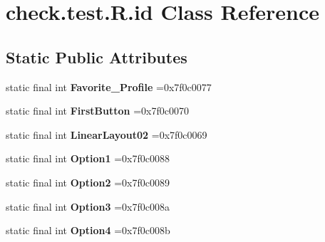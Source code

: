\hypertarget{classcheck_1_1test_1_1_r_1_1id}{}\section{check.\+test.\+R.\+id Class Reference}
\label{classcheck_1_1test_1_1_r_1_1id}
\subsection*{Static Public Attributes}
\begin{DoxyCompactItemize}
\item 
\hypertarget{classcheck_1_1test_1_1_r_1_1id_aa03ba75a03af6646416b8268bc50b51c}{}static final int {\bfseries Favorite\+\_\+\+Profile} =0x7f0c0077\label{classcheck_1_1test_1_1_r_1_1id_aa03ba75a03af6646416b8268bc50b51c}

\item 
\hypertarget{classcheck_1_1test_1_1_r_1_1id_a57a9e2e33ea1698752311ee2f1ab0b5f}{}static final int {\bfseries First\+Button} =0x7f0c0070\label{classcheck_1_1test_1_1_r_1_1id_a57a9e2e33ea1698752311ee2f1ab0b5f}

\item 
\hypertarget{classcheck_1_1test_1_1_r_1_1id_ac553af6d07f7501694b1685a3bbf904b}{}static final int {\bfseries Linear\+Layout02} =0x7f0c0069\label{classcheck_1_1test_1_1_r_1_1id_ac553af6d07f7501694b1685a3bbf904b}

\item 
\hypertarget{classcheck_1_1test_1_1_r_1_1id_a6513a6dad138e2680bfab91c487afb6a}{}static final int {\bfseries Option1} =0x7f0c0088\label{classcheck_1_1test_1_1_r_1_1id_a6513a6dad138e2680bfab91c487afb6a}

\item 
\hypertarget{classcheck_1_1test_1_1_r_1_1id_a717e4776376bda791d0545c9a5048237}{}static final int {\bfseries Option2} =0x7f0c0089\label{classcheck_1_1test_1_1_r_1_1id_a717e4776376bda791d0545c9a5048237}

\item 
\hypertarget{classcheck_1_1test_1_1_r_1_1id_a41cc64fc2a0d148958e5ce5e96df3edb}{}static final int {\bfseries Option3} =0x7f0c008a\label{classcheck_1_1test_1_1_r_1_1id_a41cc64fc2a0d148958e5ce5e96df3edb}

\item 
\hypertarget{classcheck_1_1test_1_1_r_1_1id_a69bc11665be8a9f21a6a99b7407628fd}{}static final int {\bfseries Option4} =0x7f0c008b\label{classcheck_1_1test_1_1_r_1_1id_a69bc11665be8a9f21a6a99b7407628fd}


\end{DoxyCompactItemize}
